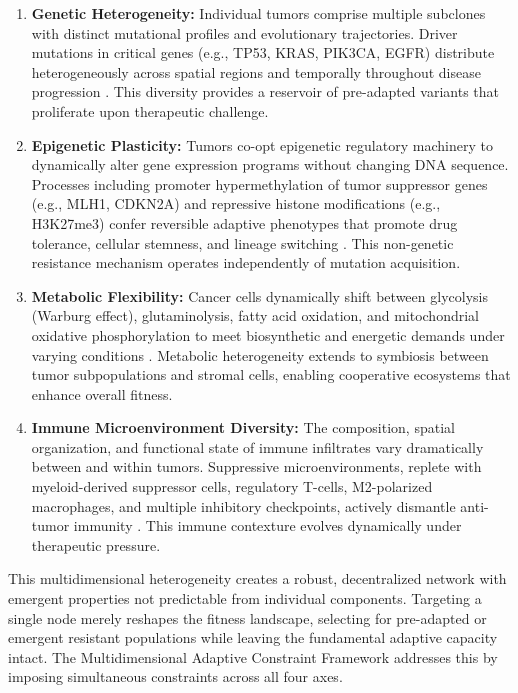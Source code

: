 \documentclass[12pt,a4paper]{article}
\begin{document}
\begin{enumerate}[leftmargin=*]
    \item \textbf{Genetic Heterogeneity:} Individual tumors comprise multiple subclones with distinct mutational profiles and evolutionary trajectories. Driver mutations in critical genes (e.g., TP53, KRAS, PIK3CA, EGFR) distribute heterogeneously across spatial regions and temporally throughout disease progression \citep{mcgranahan2017}. This diversity provides a reservoir of pre-adapted variants that proliferate upon therapeutic challenge.
    
    \item \textbf{Epigenetic Plasticity:} Tumors co-opt epigenetic regulatory machinery to dynamically alter gene expression programs without changing DNA sequence. Processes including promoter hypermethylation of tumor suppressor genes (e.g., MLH1, CDKN2A) and repressive histone modifications (e.g., H3K27me3) confer reversible adaptive phenotypes that promote drug tolerance, cellular stemness, and lineage switching \citep{baylin2016}. This non-genetic resistance mechanism operates independently of mutation acquisition.
    
    \item \textbf{Metabolic Flexibility:} Cancer cells dynamically shift between glycolysis (Warburg effect), glutaminolysis, fatty acid oxidation, and mitochondrial oxidative phosphorylation to meet biosynthetic and energetic demands under varying conditions \citep{pavlova2016}. Metabolic heterogeneity extends to symbiosis between tumor subpopulations and stromal cells, enabling cooperative ecosystems that enhance overall fitness.
    
    \item \textbf{Immune Microenvironment Diversity:} The composition, spatial organization, and functional state of immune infiltrates vary dramatically between and within tumors. Suppressive microenvironments, replete with myeloid-derived suppressor cells, regulatory T-cells, M2-polarized macrophages, and multiple inhibitory checkpoints, actively dismantle anti-tumor immunity \citep{binnewies2018}. This immune contexture evolves dynamically under therapeutic pressure.
\end{enumerate}

This multidimensional heterogeneity creates a robust, decentralized network with emergent properties not predictable from individual components. Targeting a single node merely reshapes the fitness landscape, selecting for pre-adapted or emergent resistant populations while leaving the fundamental adaptive capacity intact. The Multidimensional Adaptive Constraint Framework addresses this by imposing simultaneous constraints across all four axes.
\end{document}
